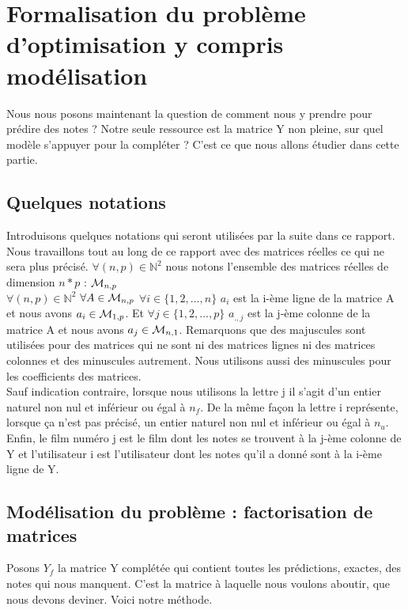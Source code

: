 \documentclass[a4paper,10pt]{article}
\begin{document}
\section{Formalisation du problème d'optimisation y compris modélisation}

Nous nous posons maintenant la question de comment nous y prendre pour prédire des notes ?
Notre seule ressource est la matrice Y non pleine, sur quel modèle s'appuyer pour la compléter ?
C'est ce que nous allons étudier dans cette partie.

\subsection{Quelques notations}

Introduisons quelques notations qui seront utilisées par la suite dans ce rapport.\\

Nous travaillons tout au long de ce rapport avec des matrices réelles ce qui ne sera plus précisé. $\forall (n, p) \in \mathbb{N}^2$ nous notons l'ensemble des matrices réelles de dimension $n * p$ : ${\cal M}_{n, p}$\\
$\forall (n, p) \in \mathbb{N}^2$ $\forall A \in {\cal M}_{n, p}$ $\forall i \in \{1, 2, ..., n\}$ $a_i$ est la i-ème ligne de la matrice A et nous avons $a_i \in {\cal M}_{1, p}$. Et $\forall j \in \{1, 2, ..., p\}$ $a_{., j}$ est la j-ème colonne de la matrice A et nous avons $a_j \in {\cal M}_{n, 1}$. Remarquons que des majuscules sont utilisées pour des matrices qui ne sont ni des matrices lignes ni des matrices colonnes et des minuscules autrement. Nous utilisons aussi des minuscules pour les coefficients des matrices.\\
Sauf indication contraire, lorsque nous utilisons la lettre j il s'agit d'un entier naturel non nul et inférieur ou égal à $n_f$. De la même façon la lettre i représente, lorsque ça n'est pas précisé, un entier naturel non nul et inférieur ou égal à $n_u$.\\
Enfin, le film numéro j est le film dont les notes se trouvent à la j-ème colonne de Y et l'utilisateur i est l'utilisateur dont les notes qu'il a donné sont à la i-ème ligne de Y.

\subsection{Modélisation du problème : factorisation de matrices}

Posons $Y_f$ la matrice Y complétée qui contient toutes les prédictions, exactes, des notes qui nous manquent. C'est la matrice à laquelle nous voulons aboutir, que nous devons deviner. Voici notre méthode.\\ 
 
\end{document}

